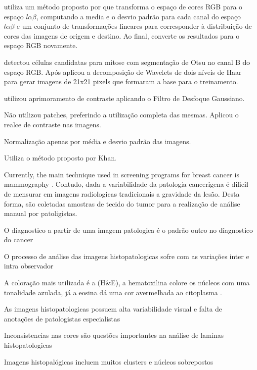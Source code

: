 \documentclass[preprint,12pt,authoryear]{elsarticle}
\begin{document}
\cite{LI2019} utiliza um método proposto por \cite{REINHARD2001} que transforma o espaço de cores RGB para o espaço $l\alpha\beta$, computando a media e o desvio padrão para cada canal do espaço $l\alpha\beta$ e um conjunto de transformações lineares para corresponder à distribuição de cores das imagens de origem e destino. Ao final, converte os resultados para o espaço RGB novamente.

\cite{DAS2019} detectou células candidatas para mitose com segmentação de Otsu no canal B do espaço RGB. Após aplicou a decomposição de Wavelets de dois níveis de Haar para gerar imagens de 21x21 pixels que formaram a base para o treinamento.

\cite{BAKER2018} utilizou aprimoramento de contraste aplicando o Filtro de Desfoque Gaussiano.

\cite{FONDON2018} Não utilizou patches, preferindo a utilização completa das mesmas. Aplicou o realce de contraste nas imagens.

\cite{PAN2018} Normalização apenas por média e desvio padrão das imagens.

\cite{WAN2017a} Utiliza o método proposto por Khan.

Currently, the main technique used in screening programs for breast cancer is mammography \citep{DINIZ2018}. Contudo, dada a variabilidade da patologia cancerigena é dificil de mensurar em imagens radiologicas tradicionais a gravidade da lesão. Desta forma, são coletadas amostras de tecido do tumor para a realização de análise manual por patoligistas. 

O diagnostico a partir de uma imagem patologica é o padrão outro no diagnostico do cancer \cite{YAN2019,BEJNORDI2017}

O processo de análise das imagens histopatologicas sofre com as variações inter e intra observador \cite{MITTAL2019}


A coloração mais utilizada é a (H\&E), a hematoxilina colore os núcleos com uma tonalidade azulada, já a eosina dá uma cor avermelhada ao citoplasma \cite{ROY2019}.



As imagens histopatologicas possuem alta variabilidade visual e falta de anotações de patologistas especialistas \cite{PUERTO2016}

Inconsistencias nas cores são questões importantes na análise de laminas histopatologicas \cite{GANDOMKAR2018a}


Imagens histopalógicas incluem muitos clusters e núcleos sobrepostos \cite{BAKER2018}
\end{document}

